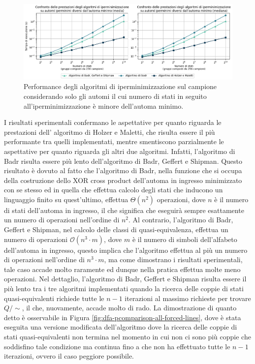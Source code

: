 \documentclass[a4paper,12pt,twoside, openright]{report} %
\newcommand{\partitioned}[2]{#1\slash\!\!#2}  %
\newcommand{\bigo}[0]{\mathcal{O}}            %
\begin{document}
\begin{figure}[!htb]
  \centering
  \includegraphics[width=1\linewidth]{images/performance_filtered_line.png}
  \caption{\label{fig:dfa-pcomparison-only-lines}Performance degli algoritmi di iperminimizzazione sul
  campione considerando solo gli automi il cui numero di stati in seguito all'iperminimizzazione
  è minore dell'automa minimo.}
\end{figure}

I risultati sperimentali confermano le aspettative per quanto riguarda le prestazioni dell'
algoritmo di Holzer e Maletti, che risulta essere il più performante tra quelli implementati, mentre smentiscono
parzialmente le aspettative per quanto riguarda gli altri due algoritmi. Infatti, l'algoritmo di Badr risulta
essere più lento dell'algoritmo di Badr, Geffert e Shipman. Questo risultato è dovuto al fatto che 
l'algoritmo di Badr, nella funzione che si occupa della costruzione dello XOR cross product dell'automa in
ingresso minimizzato con se stesso ed in quella che effettua calcolo degli stati che inducono un linguaggio
finito su quest'ultimo, effettua $\Theta(n^2)$ operazioni, dove $n$ è il numero di stati dell'automa in ingresso, il che significa che eseguirà sempre esattamente 
un numero di operazioni nell'ordine di $n^2$. Al contrario, l'algoritmo di Badr, Geffert e Shipman, nel calcolo delle classi di
quasi-equivalenza, effettua un numero di operazioni $\bigo(n^3 \cdot m)$, dove $m$ è il
numero di simboli dell'alfabeto dell'automa in ingresso, questo implica che l'algoritmo effettua al più
un numero di operazioni nell'ordine di $n^3 \cdot m$, ma come dimostrano i risultati sperimentali, tale caso
accade molto raramente ed dunque nella pratica effettua molte meno operazioni.
Nel dettaglio, l'algoritmo di Badr, Geffert e Shipman risulta essere il più lento tra i tre algoritmi implementati
quando la ricerca delle coppie di stati quasi-equivalenti richiede tutte le $n-1$ iterazioni al massimo richieste
per trovare $\partitioned{Q}{\sim}$, il che, nuovamente, accade molto di rado. La dimostrazione di quanto detto è
osservabile in Figura \ref{fig:dfa-pcomparison-all-forced-lines}, dove è stata eseguita una versione modificata dell'algoritmo 
dove la ricerca delle coppie di stati quasi-equivalenti non termina nel momento in cui non ci sono più coppie
che soddisfino tale condizione ma continua fino a che non ha effettuato tutte le $n-1$ iterazioni, ovvero il caso
peggiore possibile.
\end{document}
